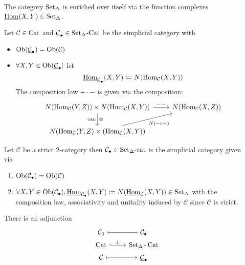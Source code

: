 \begin{exmp}
	The category $ \operatorname{Set}_{\Delta} $ is enriched over itself via the function complexes $ \underline{ \operatorname{Hom} } ( X , Y ) \in \operatorname{Set}_{\Delta} $.
\end{exmp}

\begin{exmp}
	Let $ \mathcal{ C } \in \operatorname{Cat} $ and $ \underline{ \mathcal{ C } }_\bullet \in \operatorname{Set}_\Delta $-$ \operatorname{Cat} $ be the simplicial category with 
	\begin{itemize}
		\item 
		$\operatorname{Ob} ( \underline { \mathcal{ C } }_\bullet ) = \operatorname{Ob} ( \mathcal{ C } ) $
		
		\item 
		$ \forall X ,Y \in \operatorname{Ob} ( \underline{ \mathcal{ C } }_\bullet ) $ let 
		\[
			\underline{ \operatorname{Hom} }_{ \underline{ \mathcal{ C } }_\bullet } ( X , Y )
			\coloneqq
			N ( \operatorname{Hom}_{ \mathcal{ C } } ( X , Y ) )
		\]
		The composition law $ - \cdot - $ is given via the composition:
		\[
		\begin{tikzcd}
			N ( \Hom_\mathcal{ C } ( Y , Z ) ) 
			\times 
			N ( \Hom_\mathcal{ C } ( X , Y ) )
			\ar[r, " - \cdot - " ]
			\ar[d, " \cong ", " \can "']
			&
			N ( \Hom_\mathcal{ C } ( X , Z ) )
			\\
			N ( \Hom_\mathcal{ C } ( Y , Z )  
			\times 
			( \Hom_\mathcal{ C } ( X , Y ) )
			\ar[ru, "{ N ( - \circ - ) } "' ]
		\end{tikzcd}
		\]
	\end{itemize}
\end{exmp}

\begin{exmp}
	Let $ \mathcal{ C } $ be a strict 2-category then $ \mathcal{ C }_{ \bullet } \in \operatorname{Set_{ \Delta }-cat} $ is the simplicial category given via 
	\begin{enumerate}
		\item 
		$ \operatorname{Ob} ( \mathcal{ C }_\bullet ) 
		=
		\operatorname{Ob} ( \mathcal{ C } )$
		
		\item 
		$ \forall X ,Y \in \operatorname{Ob} ( \mathcal{ C }_\bullet ), \underline{ \operatorname{Hom} }_{ \mathcal{ C }_{ \bullet } } ( X , Y ) \coloneqq N ( \underline{ \operatorname{Hom} }_{ \mathcal{ C } } ( X  ,Y ) ) \in \operatorname{Set}_{\Delta} $ with the composition law, associativity and unitality induced by $ \mathcal{ C } $ since $ \mathcal{ C } $ is strict.
	\end{enumerate}
\end{exmp}

\begin{rmk}
	There is an adjunction
	\[
	\begin{tikzcd}[row sep=0.1cm]
		\mathcal{ C }_0
		&
		\mathcal{ C }_\bullet
		\ar[l, mapsto]
		\\
		\Cat 
		\ar[r, hook, "\adj"]
		&
		\SetD\text{-}\Cat
		\\
		\mathcal{ C } 
		\ar[r, mapsto]
		&
		\underline{\mathcal{ C } }_\bullet
	\end{tikzcd}
	\]
\end{rmk}

